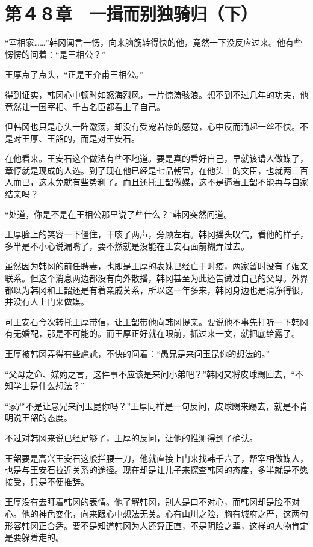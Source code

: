 \section{第４８章　一揖而别独骑归（下）}

“宰相家……”韩冈闻言一愣，向来脑筋转得快的他，竟然一下没反应过来。他有些愣愣的问着：“是王相公？”

王厚点了点头，“正是王介甫王相公。”

得到证实，韩冈心中顿时如怒海烈风，一片惊涛骇浪。想不到不过几年的功夫，他竟然让一国宰相、千古名臣都看上了自己。

但韩冈也只是心头一阵激荡，却没有受宠若惊的感觉，心中反而涌起一丝不快。不是对王厚、王韶的，而是对王安石。

在他看来。王安石这个做法有些不地道。要是真的看好自己，早就该请人做媒了，章惇就是现成的人选。到了现在他已经是七品朝官，在他头上的文臣，也就两三百人而已，这未免就有些势利了。而且还托王韶做媒，这不是逼着王韶不能再与自家结亲吗？

“处道，你是不是在王相公那里说了些什么？”韩冈突然问道。

王厚脸上的笑容一下僵住，干咳了两声，旁顾左右。韩冈摇头叹气，看他的样子，多半是不小心说漏嘴了，要不然就是没能在王安石面前糊弄过去。

虽然因为韩冈的前任聘妻，也即是王厚的表妹已经亡于时疫，两家暂时没有了姻亲联系。但这个消息两边都没有向外散播，韩冈甚至为此还告诫过自己的父母。外界都以为韩冈和王韶还是有着亲戚关系，所以这一年多来，韩冈身边也是清净得很，并没有人上门来做媒。

可王安石今次转托王厚带信，让王韶带他向韩冈提亲。要说他不事先打听一下韩冈有无婚配，那是不可能的。而王厚正好就在眼前，抓过来一文，就把底给露了。

王厚被韩冈弄得有些尴尬，不快的问着：“愚兄是来问玉昆你的想法的。”

“父母之命、媒妁之言，这件事不应该是来问小弟吧？”韩冈又将皮球踢回去，“不知学士是什么想法？”

“家严不是让愚兄来问玉昆你吗？”王厚同样是一句反问，皮球踢来踢去，就是不肯明说王韶的态度。

不过对韩冈来说已经足够了，王厚的反问，让他的推测得到了确认。

王韶要是高兴王安石这般拦腰一刀，他就直接上门来找韩千六了，帮宰相做媒人，也是与王安石拉近关系的途径。现在却是让儿子来探查韩冈的态度，多半就是不愿接受，只是不便推辞。

王厚没有去盯着韩冈的表情。他了解韩冈，别人是口不对心，而韩冈却是脸不对心。他的神色变化，向来跟心中想法无关。心有山川之险，胸有城府之严，这两句形容韩冈正合适。要不是知道韩冈为人还算正直，不是阴险之辈，这样的人物肯定是要躲着走的。

